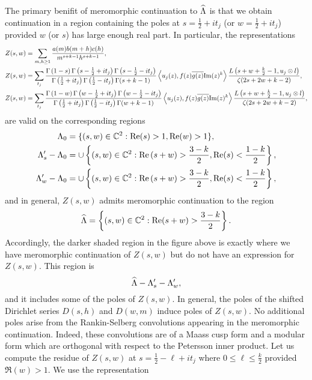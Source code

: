 \documentclass[12pt,reqno,oneside]{amsart}
\begin{document}
  The primary benifit of meromorphic continuation to $\widehat{\Lambda}$ is that we obtain continuation in a region containing the poles at $s = \frac{1}{2}+it_{j}$ (or $w = \frac{1}{2}+it_{j}$) provided $w$ (or $s$) has large enough real part. In particular, the representations
  \begin{align*}
    Z(s,w) &= \sum_{m,h \ge 1}\frac{a(m)b(m+h)c(h)}{m^{s+k-1}h^{s+k-1}}, \\
    Z(s,w) &= \sum_{t_{j}}\frac{\Gamma\left(1-s\right)\Gamma\left(s-\frac{1}{2}+it_{j}\right)\Gamma\left(s-\frac{1}{2}-it_{j}\right)}{\Gamma\left(\frac{1}{2}+it_{j}\right)\Gamma\left(\frac{1}{2}-it_{j}\right)\Gamma(s+k-1)}\left\langle u_{j}(z),f(z)\overline{g(z)}\mathrm{Im}(z)^{k}\right\rangle\frac{L\left(s+w+\frac{k}{2}-1,u_{j} \otimes l\right)}{\zeta(2s+2w+k-2)}, \\
    Z(s,w) &= \sum_{t_{j}}\frac{\Gamma\left(1-w\right)\Gamma\left(w-\frac{1}{2}+it_{j}\right)\Gamma\left(w-\frac{1}{2}-it_{j}\right)}{\Gamma\left(\frac{1}{2}+it_{j}\right)\Gamma\left(\frac{1}{2}-it_{j}\right)\Gamma(w+k-1)}\left\langle u_{j}(z),f(z)\overline{g(z)}\mathrm{Im}(z)^{k}\right\rangle\frac{L\left(s+w+\frac{k}{2}-1,u_{j} \otimes l\right)}{\zeta(2s+2w+k-2)},
  \end{align*}
  are valid on the corresponding regions
  \begin{align*}
      \Lambda_{0} &= \{(s,w) \in \mathbb{C}^{2}:\mathrm{Re}(s) > 1, \mathrm{Re}(w) > 1\}, \\
      \Lambda_{s}'-\Lambda_{0} &= \cup \left\{(s,w) \in \mathbb{C}^{2}:\mathrm{Re}\left(s+w\right) > \frac{3-k}{2}, \mathrm{Re}(s) < \frac{1-k}{2}\right\}, \\
      \Lambda_{w}'-\Lambda_{0} &= \cup \left\{(s,w) \in \mathbb{C}^{2}:\mathrm{Re}\left(s+w\right) > \frac{3-k}{2}, \mathrm{Re}(s) < \frac{1-k}{2}\right\},
  \end{align*}
  and in general, $Z(s,w)$ admits meromorphic continuation to the region
  \[
    \widehat{\Lambda} = \left\{(s,w) \in \mathbb{C}^{2}:\mathrm{Re}(s+w) > \frac{3-k}{2}\right\}.
  \]
  Accordingly, the darker shaded region in the figure above is exactly where we have meromorphic continuation of $Z(s,w)$ but do not have an expression for $Z(s,w)$. This region is
  \[
    \widehat{\Lambda}-\Lambda_{s}'-\Lambda_{w}',
  \]
  and it includes some of the poles of $Z(s,w)$. In general, the poles of the shifted Dirichlet series $D(s,h)$ and $D(w,m)$ induce poles of $Z(s,w)$. No additional poles arise from the Rankin-Selberg convolutions appearing in the meromorphic continuation. Indeed, these convolutions are of a Maass cusp form and a modular form which are orthogonal with respect to the Petersson inner product. Let us compute the residue of $Z(s,w)$ at $s = \frac{1}{2}-\ell+it_{j}$ where $0 \le \ell \le \frac{k}{2}$ provided $\Re(w) > 1$. We use the representation
\end{document}
